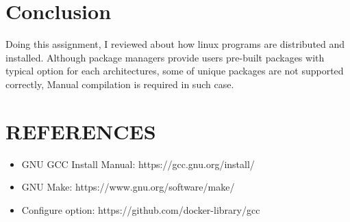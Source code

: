 \documentclass{article}
\begin{document}
\section{Conclusion}

Doing this assignment, I reviewed about how linux programs are distributed and installed.
Although package managers provide users pre-built packages with typical option for each architectures,
some of unique packages are not supported correctly, Manual compilation is required in such case.


\section*{REFERENCES}

\begin{itemize}
    \item GNU GCC Install Manual: https://gcc.gnu.org/install/
    \item GNU Make: https://www.gnu.org/software/make/
    \item Configure option: https://github.com/docker-library/gcc
\end{itemize}
\end{document}
